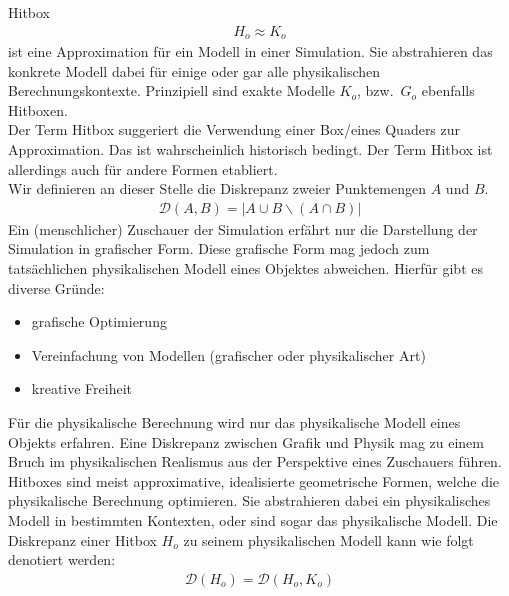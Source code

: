 \label{sec:hitbox}
Hitbox 
\begin{align}
H_o \approx K_o
\end{align}
ist eine Approximation für ein Modell in einer Simulation. Sie abstrahieren das konkrete Modell dabei für einige oder gar alle physikalischen Berechnungskontexte. Prinzipiell sind exakte Modelle $K_o$, bzw.~$G_o$ ebenfalls Hitboxen.\\
Der Term Hitbox suggeriert die Verwendung einer Box/eines Quaders zur Approximation. Das ist wahrscheinlich historisch bedingt. Der Term Hitbox ist allerdings auch für andere Formen etabliert.\\
Wir definieren an dieser Stelle die Diskrepanz zweier Punktemengen $A$ und $B$.
\begin{align}
	\mathcal{D}(A, B) = | A \cup B \backslash (A \cap B) |
\end{align} 
Ein (menschlicher) Zuschauer der Simulation erfährt nur die Darstellung der Simulation in grafischer Form. Diese grafische Form mag jedoch zum tatsächlichen physikalischen Modell eines Objektes abweichen.
Hierfür gibt es diverse Gründe:
\begin{itemize}
\item grafische Optimierung
\item Vereinfachung von Modellen (grafischer oder physikalischer Art)
\item kreative Freiheit
\end{itemize}
Für die physikalische Berechnung wird nur das physikalische Modell eines Objekts erfahren. Eine Diskrepanz zwischen Grafik und Physik mag zu einem Bruch im physikalischen Realismus aus der Perspektive eines Zuschauers führen.
Hitboxes sind meist approximative, idealisierte geometrische Formen, welche die physikalische Berechnung optimieren. Sie abstrahieren dabei ein physikalisches Modell in bestimmten Kontexten, oder sind sogar das physikalische Modell. 
Die Diskrepanz einer Hitbox $H_o$ zu seinem physikalischen Modell kann wie folgt denotiert werden:
\begin{align}
\mathcal{D}(H_o) = \mathcal{D}(H_o, K_o)
\end{align}

